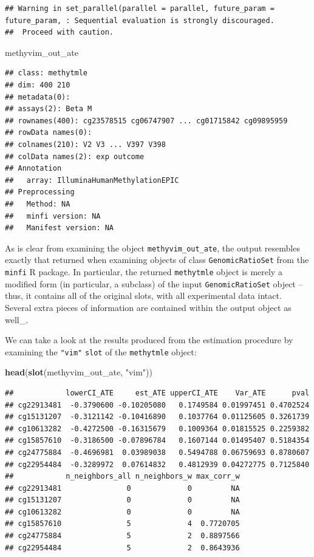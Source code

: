 \documentclass[9pt,a4paper,]{extarticle}
\newenvironment{Shaded}{\begin{snugshade}}{\end{snugshade}}
\newcommand{\KeywordTok}[1]{\textcolor[rgb]{0.13,0.29,0.53}{\textbf{#1}}}
\newcommand{\StringTok}[1]{\textcolor[rgb]{0.31,0.60,0.02}{#1}}
\newcommand{\NormalTok}[1]{#1}
\theoremstyle{definition}
\theoremstyle{definition}
\theoremstyle{definition}
\theoremstyle{remark}
\begin{document}
\begin{verbatim}
## Warning in set_parallel(parallel = parallel, future_param = future_param, : Sequential evaluation is strongly discouraged. 
##  Proceed with caution.
\end{verbatim}

\begin{Shaded}
\begin{Highlighting}[]
\NormalTok{methyvim_out_ate}
\end{Highlighting}
\end{Shaded}

\begin{verbatim}
## class: methytmle 
## dim: 400 210 
## metadata(0):
## assays(2): Beta M
## rownames(400): cg23578515 cg06747907 ... cg01715842 cg09895959
## rowData names(0):
## colnames(210): V2 V3 ... V397 V398
## colData names(2): exp outcome
## Annotation
##   array: IlluminaHumanMethylationEPIC
## Preprocessing
##   Method: NA
##   minfi version: NA
##   Manifest version: NA
\end{verbatim}

As is clear from examining the object \texttt{methyvim\_out\_ate}, the
output resembles exactly that returned when examining objects of class
\texttt{GenomicRatioSet} from the \texttt{minfi} R package. In
particular, the returned \texttt{methytmle} object is merely a modified
form (in particular, a subclass) of the input \texttt{GenomicRatioSet}
object -- thus, it contains all of the original slots, with all
experimental data intact. Several extra pieces of information are
contained within the output object as well\_.

We can take a look at the results produced from the estimation procedure
by examining the \texttt{"vim"} \texttt{slot} of the \texttt{methytmle}
object:

\begin{Shaded}
\begin{Highlighting}[]
\KeywordTok{head}\NormalTok{(}\KeywordTok{slot}\NormalTok{(methyvim_out_ate, }\StringTok{"vim"}\NormalTok{))}
\end{Highlighting}
\end{Shaded}

\begin{verbatim}
##            lowerCI_ATE     est_ATE upperCI_ATE    Var_ATE      pval
## cg22913481  -0.3790600 -0.10205080   0.1749584 0.01997451 0.4702524
## cg15131207  -0.3121142 -0.10416890   0.1037764 0.01125605 0.3261739
## cg10613282  -0.4272500 -0.16315679   0.1009364 0.01815525 0.2259382
## cg15857610  -0.3186500 -0.07896784   0.1607144 0.01495407 0.5184354
## cg24775884  -0.4696981  0.03989038   0.5494788 0.06759693 0.8780607
## cg22954484  -0.3289972  0.07614832   0.4812939 0.04272775 0.7125840
##            n_neighbors_all n_neighbors_w max_corr_w
## cg22913481               0             0         NA
## cg15131207               0             0         NA
## cg10613282               0             0         NA
## cg15857610               5             4  0.7720705
## cg24775884               5             2  0.8897566
## cg22954484               5             2  0.8643936
\end{verbatim}
\end{document}
